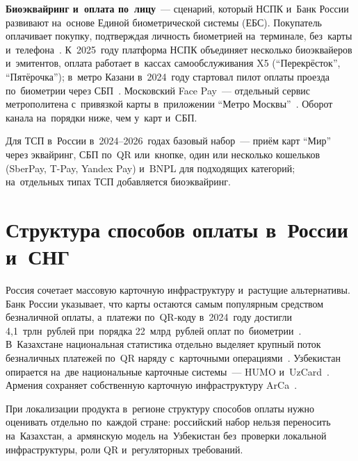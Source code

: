 \textbf{Биоэквайринг и~оплата по~лицу}~--- сценарий, который НСПК и~Банк России
развивают на~основе Единой биометрической системы (ЕБС). Покупатель оплачивает
покупку, подтверждая личность биометрией на~терминале, без~карты
и~телефона~\cite{nspk-biopay-overview,ebs-overview}. К~2025~году платформа НСПК
объединяет несколько биоэквайеров и~эмитентов, оплата работает в~кассах
самообслуживания X5 (\enquote{Перекрёсток}, \enquote{Пятёрочка});
в~метро Казани в~2024~году стартовал пилот оплаты проезда по~биометрии
через СБП~\cite{cbr-results-2024-payments}. Московский Face Pay~--- отдельный
сервис метрополитена с~привязкой карты в~приложении \enquote{Метро
Москвы}~\cite{mos-facepay-2021}. Оборот канала на~порядки ниже, чем у~карт
и~СБП.

Для ТСП в~России в~2024--2026~годах базовый набор~--- приём карт
\enquote{Мир} через эквайринг, СБП по~QR или~кнопке, один или несколько
кошельков (SberPay, T-Pay, Yandex Pay) и~BNPL для подходящих категорий;
на~отдельных типах ТСП добавляется биоэквайринг.

\section{Структура способов оплаты в~России и~СНГ}\label{sec:payments-mix-cis}

Россия сочетает массовую карточную инфраструктуру и~растущие альтернативы.
Банк России указывает, что карты остаются самым популярным
средством безналичной оплаты, а~платежи по~QR-коду в~2024~году достигли
4{,}1~трлн~рублей при~порядка 22~млрд~рублей оплат
по~биометрии~\cite{cbr-results-2024-payments}. В~Казахстане национальная
статистика отдельно выделяет крупный поток безналичных платежей по~QR наряду
с~карточными операциями~\cite{nbk-payment-cards-2025jan}.
Узбекистан опирается на~две национальные карточные системы~--- HUMO
и~UzCard~\cite{humo-faq,uzcard-about}. Армения сохраняет собственную карточную
инфраструктуру ArCa~\cite{arca-about}.

При локализации продукта в~регионе структуру способов оплаты нужно оценивать
отдельно по~каждой стране: российский набор нельзя переносить на~Казахстан,
а~армянскую модель на~Узбекистан без~проверки локальной инфраструктуры, роли QR
и~регуляторных требований.


